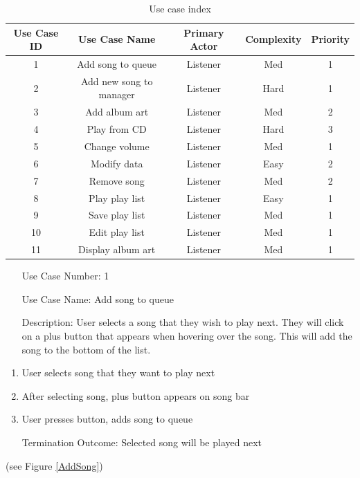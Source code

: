 \documentclass[10pt,conference,onecolumn,compsoc]{IEEEtran}
\begin{document}
\begin{table}
\centering
\begin{tabular}{|c|c|c|c|c|}
\hline
Use Case ID & Use Case Name & Primary Actor & Complexity & Priority \\
\hline \hline
1 & Add song to queue & Listener & Med & 1\\
\hline
2 & Add new song to manager & Listener & Hard & 1\\
\hline
3 & Add album art & Listener & Med & 2\\
\hline
4 & Play from CD & Listener & Hard & 3\\
\hline
5 & Change volume & Listener & Med & 1\\
\hline
6 & Modify data & Listener & Easy & 2\\
\hline
7 & Remove song & Listener & Med & 2\\
\hline
8 & Play play list & Listener & Easy & 1\\
\hline
9 & Save play list & Listener & Med & 1\\
\hline
10 & Edit play list & Listener & Med & 1\\
\hline
11 & Display album art & Listener & Med & 1\\
\hline

\end{tabular}
\caption{Use case index}
\label{tab:useCaseIndex}
\end{table}


\begin{itemize}
\item[Use Case Number:] 1
\item[Use Case Name:] Add song to queue
\item[Description:] User selects a song that they wish to play next. They will click on a plus button that appears when hovering over the song. This will add the song to the bottom of the list.
\end{itemize}

\begin{enumerate}
\item User selects song that they want to play next
\item After selecting song, plus button appears on song bar
\item User presses button, adds song to queue
\item[Termination Outcome:] Selected song will be played next
\end{enumerate}

(see Figure \ref{AddSong})
\end{document}
